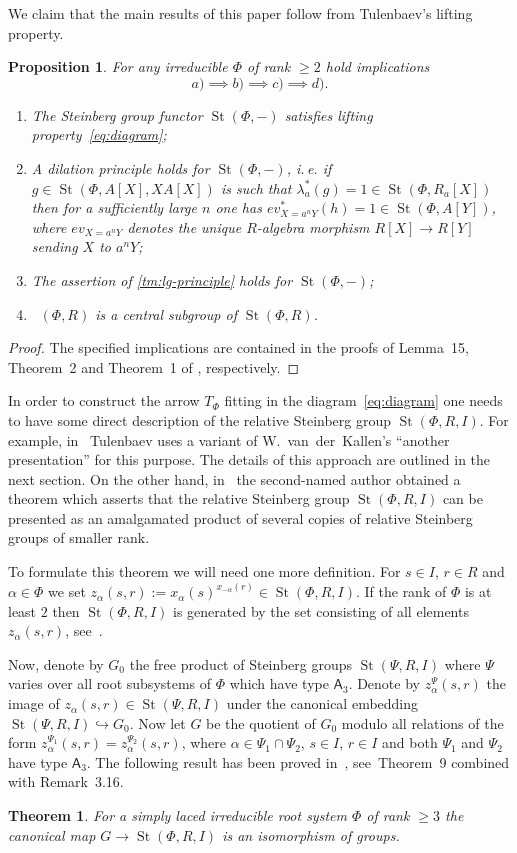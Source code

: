 \documentclass[11pt]{amsart}
\theoremstyle{plain} \declaretheorem[name=Theorem, Refname={Theorem,Theorems}]{tm} \Crefname{tm}{Theorem}{Theorems}
\numberwithin{equation}{section}
\newtheorem{prop}[lm]{Proposition} \Crefname{prop}{Proposition}{Propositions}
\newtheorem*{tm*}{Theorem}
\theoremstyle{definition} \newtheorem{df}[lm]{Definition} \Crefname{df}{Definition}{Definitions}
\theoremstyle{remark} \newtheorem{rk}[lm]{Remark} \Crefname{rk}{Remark}{Remarks}
\newcommand{\St}{\mathop{\mathrm{St}}\nolimits}
\newcommand{\Kt}{\mathop{\mathrm{K_2}}\nolimits}
\newcommand{\rA}{\mathsf{A}}
\begin{document}
We claim that the main results of this paper follow from Tulenbaev's lifting property.
\begin{prop} For any irreducible $\Phi$ of rank $\geq 2$ hold implications \[a) \implies b) \implies c) \implies d).\]
\begin{enumerate}
 \item The Steinberg group functor $\St(\Phi, -)$ satisfies lifting property~\eqref{eq:diagram};
 \item A dilation principle holds for $\St(\Phi, -)$, i.\,e. if $g\in\St(\Phi, A[X], XA[X])$ is such that $\lambda_a^*(g) = 1 \in \St(\Phi, R_a[X])$ then
       for a sufficiently large $n$ one has $ev_{X = a^n Y}^*(h) = 1 \in \St(\Phi, A[Y])$, where $ev_{X=a^n Y}$ denotes the unique $R$-algebra morphism $R[X]\to R[Y]$ sending $X$ to $a^nY$;
 \item The assertion of \cref{tm:lg-principle} holds for $\St(\Phi, -)$;
 \item $\Kt(\Phi, R)$ is a central subgroup of $\St(\Phi, R)$.
\end{enumerate} \end{prop}
\begin{proof} The specified implications are contained in the proofs of Lemma~15, Theorem~2 and Theorem~1 of \cite{SCh}, respectively. \end{proof}
     
In order to construct the arrow $T_\Phi$ fitting in the diagram~\eqref{eq:diagram} one needs to have some direct description of the relative Steinberg group $\St(\Phi, R, I)$.
For example, in~\cite{Tul} Tulenbaev uses a variant of W.~van~der~Kallen's ``another presentation'' for this purpose. The details of this approach are outlined in the next section.
On the other hand, in~\cite{SCh} the second-named author obtained a theorem which asserts that the relative Steinberg group $\St(\Phi, R, I)$ can be presented as an amalgamated product of
several copies of relative Steinberg groups of smaller rank. 

To formulate this theorem we will need one more definition.
For $s\in I$, $r\in R$ and $\alpha\in \Phi$ we set $z_\alpha(s, r) := x_\alpha(s)^{x_{-\alpha}(r)} \in \St(\Phi, R, I)$.
If the rank of $\Phi$ is at least $2$ then $\St(\Phi, R, I)$ is generated by the set consisting of all elements $z_\alpha(s,r)$, see~\cite[Lemma~5]{SCh}.

Now, denote by $G_0$ the free product of Steinberg groups $\St(\Psi, R, I)$ where $\Psi$ varies over all root subsystems of $\Phi$ which have type $\rA_3$.
Denote by $z_\alpha^\Psi(s,r)$ the image of $z_\alpha(s,r)\in\St(\Psi, R, I)$ under the canonical embedding $\St(\Psi, R, I) \hookrightarrow G_0$.
Now let $G$ be the quotient of $G_0$ modulo all relations of the form $z_\alpha^{\Psi_1}(s, r) = z_\alpha^{\Psi_2}(s, r)$, where $\alpha\in\Psi_1\cap\Psi_2$, $s\in I$, $r\in I$ 
and both $\Psi_1$ and $\Psi_2$ have type $\rA_3$.
The following result has been proved in~\cite{SCh}, see~Theorem~9 combined with Remark~3.16.
\begin{tm*} \label{tm:relPres} For a simply laced irreducible root system $\Phi$ of rank $\geq 3$ the canonical map $G \rightarrow \St(\Phi, R, I)$ is an isomorphism of groups.
\end{tm*}
\end{document}
